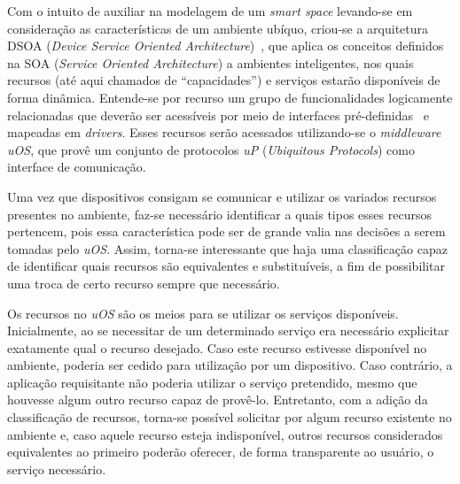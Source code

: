 Com o intuito de auxiliar na modelagem de um \emph{smart space} levando-se em consideração as características de um ambiente ubíquo, criou-se a arquitetura DSOA (\emph{Device Service Oriented Architecture})~\cite{buzetoDSOA2010}, que aplica os conceitos definidos na SOA (\emph{Service Oriented Architecture}) a ambientes inteligentes, nos quais recursos (até aqui chamados de ``capacidades'') e serviços estarão disponíveis de forma dinâmica. Entende-se por recurso um grupo de funcionalidades logicamente relacionadas que deverão ser acessíveis por meio de interfaces pré-definidas~\cite{buzeto2010} e mapeadas em \emph{drivers}. Esses recursos serão acessados utilizando-se o \emph{middleware} \emph{uOS}, que provê um conjunto de protocolos \emph{uP} (\emph{Ubiquitous Protocols}) como interface de comunicação.

Uma vez que dispositivos consigam se comunicar e utilizar os variados recursos presentes no ambiente, faz-se necessário identificar a quais tipos esses recursos pertencem, pois essa característica pode ser de grande valia nas decisões a serem tomadas pelo \emph{uOS}. Assim, torna-se interessante que haja uma classificação capaz de identificar quais recursos são equivalentes e substituíveis, a fim de possibilitar uma troca de certo recurso sempre que necessário.

Os recursos no \emph{uOS} são os meios para se utilizar os serviços disponíveis. Inicialmente, ao se necessitar de um determinado serviço era necessário explicitar exatamente qual o recurso desejado. Caso este recurso estivesse disponível no ambiente, poderia ser cedido para utilização por um dispositivo. Caso contrário, a aplicação requisitante não poderia utilizar o serviço pretendido, mesmo que houvesse algum outro recurso capaz de provê-lo. Entretanto, com a adição da classificação de recursos, torna-se possível solicitar por algum recurso existente no ambiente e, caso aquele recurso esteja indisponível, outros recursos considerados equivalentes ao primeiro poderão oferecer, de forma transparente ao usuário, o serviço necessário.

